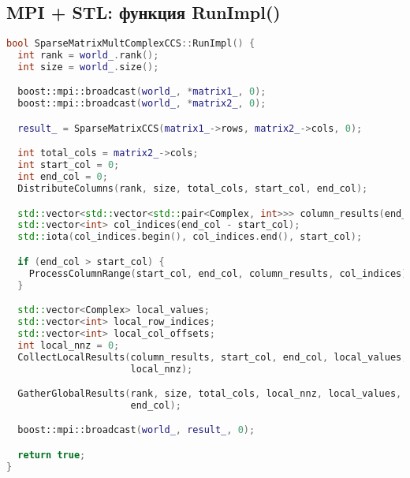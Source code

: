 \documentclass[12pt]{extarticle}
\begin{document}
\subsection*{MPI + STL: функция RunImpl()}
\begin{lstlisting}[language=C++]
bool SparseMatrixMultComplexCCS::RunImpl() {
  int rank = world_.rank();
  int size = world_.size();

  boost::mpi::broadcast(world_, *matrix1_, 0);
  boost::mpi::broadcast(world_, *matrix2_, 0);

  result_ = SparseMatrixCCS(matrix1_->rows, matrix2_->cols, 0);

  int total_cols = matrix2_->cols;
  int start_col = 0;
  int end_col = 0;
  DistributeColumns(rank, size, total_cols, start_col, end_col);

  std::vector<std::vector<std::pair<Complex, int>>> column_results(end_col - start_col);
  std::vector<int> col_indices(end_col - start_col);
  std::iota(col_indices.begin(), col_indices.end(), start_col);

  if (end_col > start_col) {
    ProcessColumnRange(start_col, end_col, column_results, col_indices);
  }

  std::vector<Complex> local_values;
  std::vector<int> local_row_indices;
  std::vector<int> local_col_offsets;
  int local_nnz = 0;
  CollectLocalResults(column_results, start_col, end_col, local_values, local_row_indices, local_col_offsets,
                      local_nnz);

  GatherGlobalResults(rank, size, total_cols, local_nnz, local_values, local_row_indices, column_results, start_col,
                      end_col);

  boost::mpi::broadcast(world_, result_, 0);

  return true;
}
\end{lstlisting}
\end{document}
